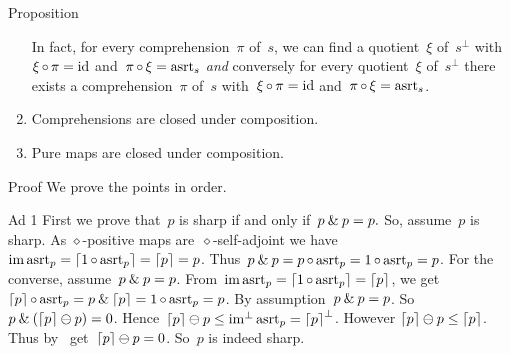 \documentclass[b]{subfiles}
\begin{document}
\begin{parsec}
\begin{point}{Proposition}
\begin{enumerate}
In fact, for every comprehension~$\pi$ of~$s$,
    we can find a quotient~$\xi$ of~$s^\perp$
    with~$\xi \mathop{\circ} \pi = \operatorname{id}$ and~$\pi \mathop{\circ} \xi = \mathrm{asrt}_s$
    \emph{and} conversely for every quotient~$\xi$ of~$s^\perp$
    there exists a comprehension~$\pi$ of~$s$
    with~$\xi \mathop{\circ} \pi = \operatorname{id}$ and~$\pi \mathop{\circ} \xi = \mathrm{asrt}_s$.
\item Comprehensions are closed under composition.
\item Pure maps are closed under composition.
\end{enumerate}
\begin{point}{Proof}%
We prove the points in order.
\begin{point}{Ad 1}%
First we prove that~$p$ is sharp if and only if~$p \mathbin{\&} p=p.$
So, assume~$p$ is sharp.
As $\diamond$-positive maps are~$\diamond$-self-adjoint
    we have~$\operatorname{im} \mathrm{asrt}_p = \left\lceil1 \mathop{\circ} \mathrm{asrt}_p\right\rceil = \left\lceil p\right\rceil = p$.
Thus~$p \mathbin{\&} p = p \mathop{\circ} \mathrm{asrt}_p = 1 \mathop{\circ} \mathrm{asrt}_p = p$.
For the converse, assume~$p \mathbin{\&} p=p$.
From~$\operatorname{im} \mathrm{asrt}_p = \left\lceil1 \mathop{\circ} \mathrm{asrt}_p\right\rceil = \left\lceil p\right\rceil$,
we get~$\left\lceil p\right\rceil \mathop{\circ} \mathrm{asrt}_p = p \mathbin{\&} \left\lceil p\right\rceil = 1 \mathop{\circ} \mathrm{asrt}_p = p$.
By assumption~$p \mathbin{\&} p=p$.
So~$p \mathbin{\&} (\left\lceil p\right\rceil \ominus p) = 0$.
Hence~$\left\lceil p\right\rceil\ominus p \leq \operatorname{im^\perp} \mathrm{asrt}_p = \left\lceil p\right\rceil^\perp$.
However $\left\lceil p\right\rceil\ominus p \leq \left\lceil p\right\rceil$.
Thus by~
    get~$\left\lceil p\right\rceil \ominus p = 0$. So~$p$ is indeed sharp.


\end{point}
\end{point}
\end{point}
\end{parsec}
\end{document}
